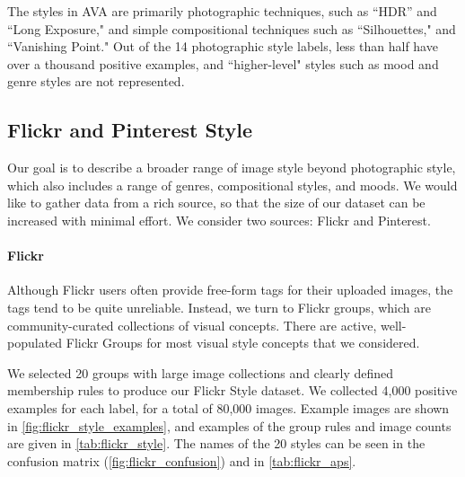 The styles in AVA are primarily photographic techniques, such as ``HDR'' and ``Long Exposure," and simple compositional techniques such as ``Silhouettes," and ``Vanishing Point."
Out of the 14 photographic style labels, less than half have over a thousand positive examples, and ``higher-level" styles such as mood and genre styles are not represented.


\subsection{Flickr and Pinterest Style}

Our goal is to describe a broader range of image style beyond photographic style, which also includes a range of genres, compositional styles, and moods.
We would like to gather data from a rich source, so that the size of our dataset can be increased with minimal effort.
We consider two sources: Flickr and Pinterest.

\paragraph{Flickr}
Although Flickr users often provide free-form tags for their uploaded images, the tags tend to be quite unreliable.
Instead, we turn to Flickr groups, which are community-curated collections of visual concepts.
There are active, well-populated Flickr Groups for most visual style concepts that we considered.

We selected 20 groups with large image collections and clearly defined membership rules to produce our Flickr Style dataset.
We collected 4,000 positive examples for each label, for a total of 80,000 images.
Example images are shown in \autoref{fig:flickr_style_examples}, and examples of the group rules and image counts are given in \autoref{tab:flickr_style}.
The names of the 20 styles can be seen in the confusion matrix (\autoref{fig:flickr_confusion}) and in \autoref{tab:flickr_aps}.


